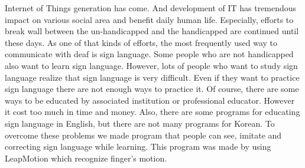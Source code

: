 \documentclass[10pt,journal,compsoc]{IEEEtran}
\begin{document}
% 
% 
% 
% 
 Internet of Things generation has come. And development of IT has tremendous impact on various social area and benefit daily human life. Especially, efforts to break wall between the un-handicapped and the handicapped are continued until these days. As one of that kinds of efforts, the most frequently used way to communicate with deaf is sign language. Some people who are not handicapped also want to learn sign language. However, lots of people who want to study sign language realize that sign language is very difficult. Even if they want to practice sign language there are not enough ways to practice it. Of course, there are some ways to be educated by associated institution or professional educator. However it cost too much in time and money. Also, there are some programs for educating sign language in English, but there are not many programs for Korean. To overcome these problems we made program that people can see, imitate and correcting sign language while learning. This program was made by using LeapMotion which recognize finger’s motion.\\

\hfill 
 
\hfill 

\IEEEpeerreviewmaketitle

\ifCLASSOPTIONcompsoc
{}
\else
\end{document}
